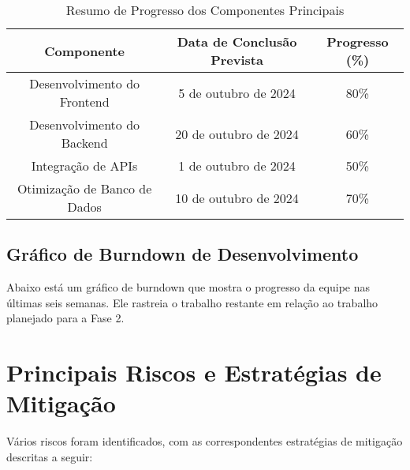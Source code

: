 \documentclass[12pt]{article}
\begin{document}
\begin{table}[h!]
\centering
\begin{tabular}{|c|c|c|}
\hline
\textbf{Componente} & \textbf{Data de Conclusão Prevista} & \textbf{Progresso (\%)} \\
\hline
Desenvolvimento do Frontend & 5 de outubro de 2024 & 80\% \\
Desenvolvimento do Backend & 20 de outubro de 2024 & 60\% \\
Integração de APIs & 1 de outubro de 2024 & 50\% \\
Otimização de Banco de Dados & 10 de outubro de 2024 & 70\% \\
\hline
\end{tabular}
\caption{Resumo de Progresso dos Componentes Principais}
\end{table}

\subsection{Gráfico de Burndown de Desenvolvimento}
Abaixo está um gráfico de burndown que mostra o progresso da equipe nas últimas seis semanas. Ele rastreia o trabalho restante em relação ao trabalho planejado para a Fase 2.

\begin{center}
\end{center}

\newpage
\section{Principais Riscos e Estratégias de Mitigação}
Vários riscos foram identificados, com as correspondentes estratégias de mitigação descritas a seguir:
\end{document}
